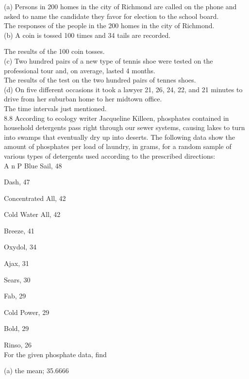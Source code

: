 (a) Persons in 200 homes in the city of Richmond are called on the phone and asked to name the candidate they favor for election to the school board. \\

The responses of the people in the 200 homes in the city of Richmond. \\

(b) A coin is tossed 100 times and 34 tails are recorded.

The results of the 100 coin tosses. \\

(c) Two hundred pairs of a new type of tennis shoe were tested on the professional tour and, on average, lasted 4 months. \\

The results of the test on the two hundred pairs of tennes shoes. \\

(d) On five different occasions it took a lawyer 21, 26, 24, 22, and 21 minutes to drive from her suburban home to her midtown office. \\

The time intervals just mentioned. \\[.5 cm]




8.8 According to ecology writer Jacqueline Killeen, phosphates contained in household detergents pass right through our sewer systems, causing lakes to turn into swamps that eventually dry up into deserts. The following data show the amount of phosphates per load of laundry, in grams, for a random sample of various types of detergents used according to the prescribed directions: \\

A n P Blue Sail, 48

Dash, 47

Concentrated All, 42

Cold Water All, 42

Breeze, 41

Oxydol, 34

Ajax, 31

Sears, 30

Fab, 29

Cold Power, 29

Bold, 29

Rinso, 26 \\

For the given phosphate data, find

(a) the mean; 35.6666

